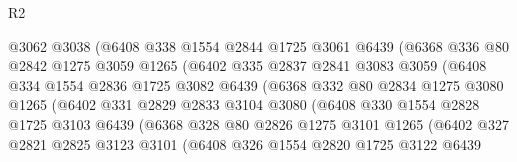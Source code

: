 \begin{lexlean}{R2}
\begin{coremodule}
                      @3062
                      @3038
                      (@6408
                        @338
                        @1554
                        @2844
                        @1725
                        @3061
                        @6439
                        (@6368
                          @336
                          @80
                          @2842
                          @1275
                          @3059
                          @1265
                          (@6402
                            @335
                            @2837
                            @2841
                            @3083
                            @3059
                            (@6408
                              @334
                              @1554
                              @2836
                              @1725
                              @3082
                              @6439
                              (@6368
                                @332
                                @80
                                @2834
                                @1275
                                @3080
                                @1265
                                (@6402
                                  @331
                                  @2829
                                  @2833
                                  @3104
                                  @3080
                                  (@6408
                                    @330
                                    @1554
                                    @2828
                                    @1725
                                    @3103
                                    @6439
                                    (@6368
                                      @328
                                      @80
                                      @2826
                                      @1275
                                      @3101
                                      @1265
                                      (@6402
                                        @327
                                        @2821
                                        @2825
                                        @3123
                                        @3101
                                        (@6408
                                          @326
                                          @1554
                                          @2820
                                          @1725
                                          @3122
                                          @6439

\end{coremodule}
\end{lexlean}
